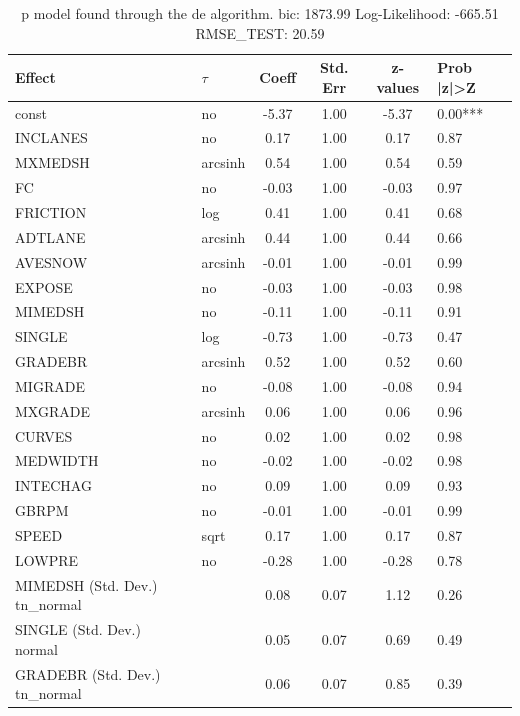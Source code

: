 \begin{table}
	\caption{p model found through the de algorithm. bic: 1873.99 Log-Likelihood: -665.51 RMSE_TEST: 20.59}
	\begin{center}
		\begin{tabular}{|l|l|c|c|c|l|}
			\hline
			Effect & $\tau$ & Coeff & Std. Err & z-values & Prob |z|>Z \\
			\hline
			const & no & -5.37 & 1.00 & -5.37 & 0.00*** \\
			\hline
			INCLANES & no & 0.17 & 1.00 & 0.17 & 0.87 \\
			\hline
			MXMEDSH & arcsinh & 0.54 & 1.00 & 0.54 & 0.59 \\
			\hline
			FC & no & -0.03 & 1.00 & -0.03 & 0.97 \\
			\hline
			FRICTION & log & 0.41 & 1.00 & 0.41 & 0.68 \\
			\hline
			ADTLANE & arcsinh & 0.44 & 1.00 & 0.44 & 0.66 \\
			\hline
			AVESNOW & arcsinh & -0.01 & 1.00 & -0.01 & 0.99 \\
			\hline
			EXPOSE & no & -0.03 & 1.00 & -0.03 & 0.98 \\
			\hline
			MIMEDSH & no & -0.11 & 1.00 & -0.11 & 0.91 \\
			\hline
			SINGLE & log & -0.73 & 1.00 & -0.73 & 0.47 \\
			\hline
			GRADEBR & arcsinh & 0.52 & 1.00 & 0.52 & 0.60 \\
			\hline
			MIGRADE & no & -0.08 & 1.00 & -0.08 & 0.94 \\
			\hline
			MXGRADE & arcsinh & 0.06 & 1.00 & 0.06 & 0.96 \\
			\hline
			CURVES & no & 0.02 & 1.00 & 0.02 & 0.98 \\
			\hline
			MEDWIDTH & no & -0.02 & 1.00 & -0.02 & 0.98 \\
			\hline
			INTECHAG & no & 0.09 & 1.00 & 0.09 & 0.93 \\
			\hline
			GBRPM & no & -0.01 & 1.00 & -0.01 & 0.99 \\
			\hline
			SPEED & sqrt & 0.17 & 1.00 & 0.17 & 0.87 \\
			\hline
			LOWPRE & no & -0.28 & 1.00 & -0.28 & 0.78 \\
			\hline
			MIMEDSH (Std. Dev.) tn_normal &  & 0.08 & 0.07 & 1.12 & 0.26 \\
			\hline
			SINGLE (Std. Dev.) normal &  & 0.05 & 0.07 & 0.69 & 0.49 \\
			\hline
			GRADEBR (Std. Dev.) tn_normal &  & 0.06 & 0.07 & 0.85 & 0.39 \\

\end{tabular}
\end{center}
\end{table}
